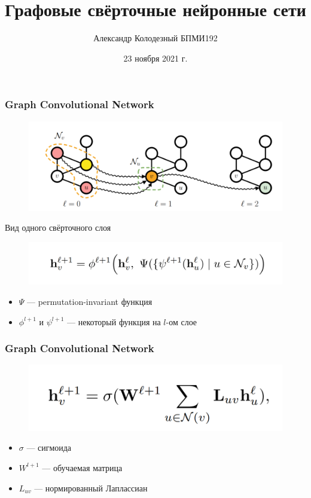 \documentclass{beamer}
\title[Заголовок]{Графовые свёрточные нейронные сети}
\author[Александр Колодезный]{Александр Колодезный БПМИ192}
\institute[Высшая школа экономики]{Национальный исследовательский университет \\ «Высшая школа экономики» (Москва)}
\date{23 ноября 2021 г.}
\begin{document}

\frame[plain]{\titlepage}	%

\begin{frame}
\frametitle{Graph Convolutional Network}
\begin{figure}
	\includegraphics[width=0.7\columnwidth]{message_propagation.png}
\end{figure}
Вид одного свёрточного слоя
\begin{figure}
	\includegraphics[width=0.8\columnwidth]{fromula1.png}
\end{figure}
\begin{itemize}
	\item $\Psi$ --- permutation-invariant функция
	\item $\phi^{l + 1}$ и $\psi^{l + 1}$ --- некоторый функция на $l$-ом слое
\end{itemize}
\end{frame}

\begin{frame}
\frametitle{Graph Convolutional Network}
\begin{figure}
	\includegraphics[width=0.8\columnwidth]{formula2.png}
\end{figure}
\begin{itemize}
	\item $\sigma$ --- сигмоида
	\item $W^{l + 1}$ --- обучаемая матрица
	\item $L_{uv}$ --- нормированный Лаплассиан
\end{itemize}
\end{frame}
\end{document}
